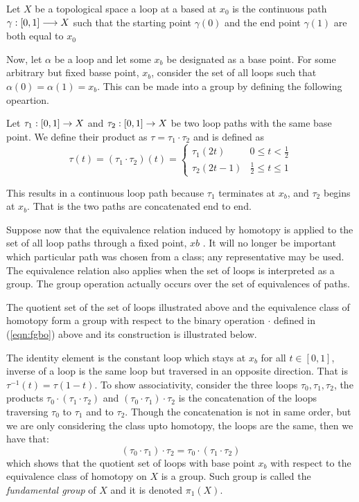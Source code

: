 \begin{defn}[Loop]\cite{enwiki:fg}
    Let $X$ be a topological space a loop at a based at $x_0$ is the continuous path $\displaystyle \gamma : [0,1] \longrightarrow X$ such that the starting point $\gamma(0)$ and the end point $\gamma(1)$ are both equal to $x_0$
\end{defn}

Now, let $\alpha$ be a loop and let some $x_b$ be designated as a base point. For some arbitrary but fixed basse point, $x_b$, consider the set of all loops such that $\alpha(0) = \alpha(1) = x_b$. This can be made into a group by defining the following opeartion.

Let $\tau_1 : [0,1] \rightarrow X$ and $\tau_2 : [0,1] \rightarrow X$ be two loop paths with the same base point. We define their product as $\tau = \tau_1 \cdot \tau_2$ and is defined as
\begin{equation}\label{eqn:fgbo}
    \tau(t) = (\tau_1 \cdot \tau_2)(t) = \begin{cases}
        \tau_1(2t) & 0 \le t < \frac12 \\
        \tau_2(2t - 1) & \frac12 \le t \le 1
    \end{cases}  
\end{equation}

This results in a continuous loop path because $\tau_1$ terminates at $x_b$, and $\tau_2$ begins at $x_b$. That is the two paths are concatenated end to end.

Suppose now that the equivalence relation induced by homotopy is applied to the set of all loop paths through a fixed point, $xb$ . It will no longer be important which particular path was chosen from a class; any representative may be used. The equivalence relation also applies when the set of loops is interpreted as a group. The group operation actually occurs over the set of equivalences of paths.

The quotient set of the set of loops illustrated above and the equivalence class of homotopy form a group with respect to the binary operation $\cdot$ defined in (\ref{eqn:fgbo}) above and its construction is illustrated below. 

The identity element is the constant loop which stays at $x_b$ for all $t \in [0,1]$, inverse of a loop is the same loop but traversed in an opposite direction. That is $\tau^{-1}(t) = \tau(1-t)$. To show associativity, consider the three loops $\tau_0, \tau_1,\tau_2$, the products $\tau_0 \cdot (\tau_1 \cdot \tau_2)$ and $(\tau_0 \cdot \tau_1) \cdot \tau_2$ is the concatenation of the loops traversing $\tau_0$ to $\tau_1$ and to $\tau_2$. Though the concatenation is not in same order, but we are only considering the class upto homotopy, the loops are the same, then we have that:
\[
    (\tau_0 \cdot \tau_1) \cdot \tau_2 = \tau_0 \cdot (\tau_1 \cdot \tau_2)
\]
which shows that the quotient set of loops with base point $x_b$ with respect to the equivalence class of homotopy on $X$ is a group. Such group is called the \textit{fundamental group} of $X$ and it is denoted $\pi_1(X)$.

